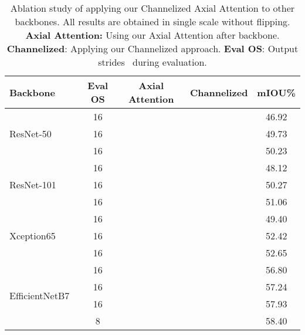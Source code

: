 \documentclass[journal]{IEEEtran}
\begin{document}
\begin{table}[t]
	\centering
	\scriptsize
	\caption{Ablation study of applying our Channelized Axial Attention to other backbones.
		All results are obtained in single scale without flipping.
		\textbf{Axial Attention:} Using our Axial Attention after backbone.
		\textbf{Channelized}: Applying our Channelized approach.
		\textbf{Eval OS}: Output strides~\cite{cDeepLabV3Plus} during evaluation.}
	
	\begin{tabular}{l |c|c|c|c}
		\toprule
		Backbone 				   										& Eval OS  	&Axial Attention    & Channelized   & mIOU\%     \\
		\midrule[0.5pt]
		\midrule[0.5pt]
		\multirow{3}{*}{ResNet-50~\cite{cResnet}  }						& 16       	&       		    &              	& 46.92     \\
		& 16       	&\checkmark		    &              	& 49.73     \\
		& 16  	   	&\checkmark		    & \checkmark  	& 50.23     \\
		\midrule
		\multirow{3}{*}{ResNet-101~\cite{cResnet}  }					& 16       	&       		    &              	& 48.12     \\
		& 16       	&\checkmark		    &              	& 50.27     \\
		& 16  	   	&\checkmark		    & \checkmark  	& 51.06     \\
		\midrule
		\multirow{3}{*}{Xception65~\cite{cXception, cDeepLabV3Plus} }	& 16       	&       		    &              	& 49.40     \\
		& 16       	&\checkmark		    &              	& 52.42     \\
		& 16  	   	&\checkmark		    & \checkmark  	& 52.65     \\
		\midrule
		\multirow{4}{*}{EfficientNetB7~\cite{cEfficientNet}}			& 16       	&       		    &              	& 56.80     \\
		& 16       	&\checkmark		    &              	& 57.24     \\
		& 16  	   	&\checkmark		    & \checkmark  	& 57.93     \\
		& 8  	   	&\checkmark		    & \checkmark  	& 58.40     \\         
		
		\bottomrule[0.5pt]
		
	\end{tabular}
	
	
	\label{tabBackbones}
	
\end{table}
\end{document}
